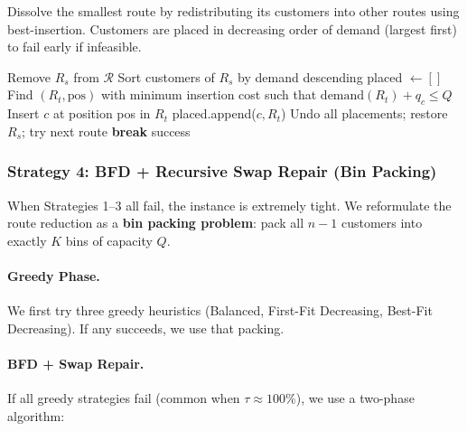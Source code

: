 \documentclass[12pt,a4paper]{article}
\theoremstyle{definition}
\begin{document}
Dissolve the smallest route by redistributing its customers into other routes using best-insertion. Customers are placed in decreasing order of demand (largest first) to fail early if infeasible.

\begin{algorithm}[H]
\caption{Strategy 3: Dissolve Route}
\begin{algorithmic}[1]
    \State Remove $R_s$ from $\mathcal{R}$
    \State Sort customers of $R_s$ by demand descending
    \State placed $\gets []$
        \State Find $(R_t, \text{pos})$ with minimum insertion cost such that $\text{demand}(R_t) + q_c \leq Q$
            \State Insert $c$ at position pos in $R_t$
            \State placed.append($c, R_t$)
        \Else
            \State Undo all placements; restore $R_s$; try next route
            \State \textbf{break}
        \EndIf
    \EndFor
        \State \Return success
    \EndIf
\EndFor
\end{algorithmic}
\end{algorithm}

\subsubsection{Strategy 4: BFD + Recursive Swap Repair (Bin Packing)}

When Strategies 1--3 all fail, the instance is extremely tight. We reformulate the route reduction as a \textbf{bin packing problem}: pack all $n-1$ customers into exactly $K$ bins of capacity $Q$.

\paragraph{Greedy Phase.} We first try three greedy heuristics (Balanced, First-Fit Decreasing, Best-Fit Decreasing). If any succeeds, we use that packing.

\paragraph{BFD + Swap Repair.} If all greedy strategies fail (common when $\tau \approx 100\%$), we use a two-phase algorithm:
\end{document}
